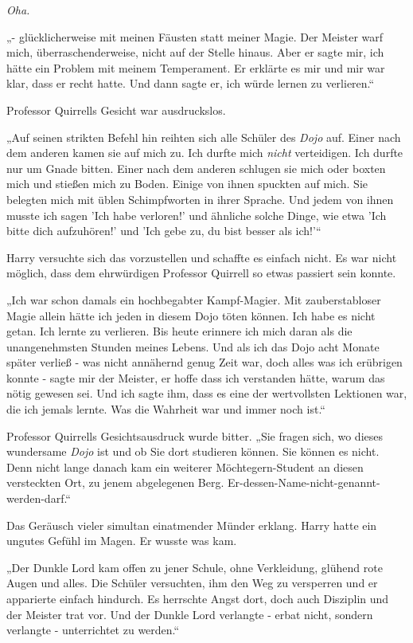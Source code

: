 {\emph{Oha.}

„- glücklicherweise mit meinen Fäusten statt meiner Magie. Der Meister warf mich, überraschenderweise, nicht auf der Stelle hinaus. Aber er sagte mir, ich hätte ein Problem mit meinem Temperament. Er erklärte es mir und mir war klar, dass er recht hatte. Und dann sagte er, ich würde lernen zu verlieren.“

Professor Quirrells Gesicht war ausdruckslos.

„Auf seinen strikten Befehl hin reihten sich alle Schüler des \emph{Dojo} auf. Einer nach dem anderen kamen sie auf mich zu. Ich durfte mich \emph{nicht} verteidigen. Ich durfte nur um Gnade bitten. Einer nach dem anderen schlugen sie mich oder boxten mich und stießen mich zu Boden. Einige von ihnen spuckten auf mich. Sie belegten mich mit üblen Schimpfworten in ihrer Sprache. Und jedem von ihnen musste ich sagen 'Ich habe verloren!' und ähnliche solche Dinge, wie etwa 'Ich bitte dich aufzuhören!' und 'Ich gebe zu, du bist besser als ich!'“

Harry versuchte sich das vorzustellen und schaffte es einfach nicht. Es war nicht möglich, dass dem ehrwürdigen Professor Quirrell so etwas passiert sein konnte.

„Ich war schon damals ein hochbegabter Kampf-Magier. Mit zauberstabloser Magie allein hätte ich jeden in diesem Dojo töten können. Ich habe es nicht getan. Ich lernte zu verlieren. Bis heute erinnere ich mich daran als die unangenehmsten Stunden meines Lebens. Und als ich das Dojo acht Monate später verließ - was nicht annähernd genug Zeit war, doch alles was ich erübrigen konnte - sagte mir der Meister, er hoffe dass ich verstanden hätte, warum das nötig gewesen sei. Und ich sagte ihm, dass es eine der wertvollsten Lektionen war, die ich jemals lernte. Was die Wahrheit war und immer noch ist.“

Professor Quirrells Gesichtsausdruck wurde bitter. „Sie fragen sich, wo dieses wundersame \emph{Dojo} ist und ob Sie dort studieren können. Sie können es nicht. Denn nicht lange danach kam ein weiterer Möchtegern-Student an diesen versteckten Ort, zu jenem abgelegenen Berg. Er-dessen-Name-nicht-genannt-werden-darf.“

Das Geräusch vieler simultan einatmender Münder erklang. Harry hatte ein ungutes Gefühl im Magen. Er wusste was kam.

„Der Dunkle Lord kam offen zu jener Schule, ohne Verkleidung, glühend rote Augen und alles. Die Schüler versuchten, ihm den Weg zu versperren und er apparierte einfach hindurch. Es herrschte Angst dort, doch auch Disziplin und der Meister trat vor. Und der Dunkle Lord verlangte - erbat nicht, sondern verlangte - unterrichtet zu werden.“

}
